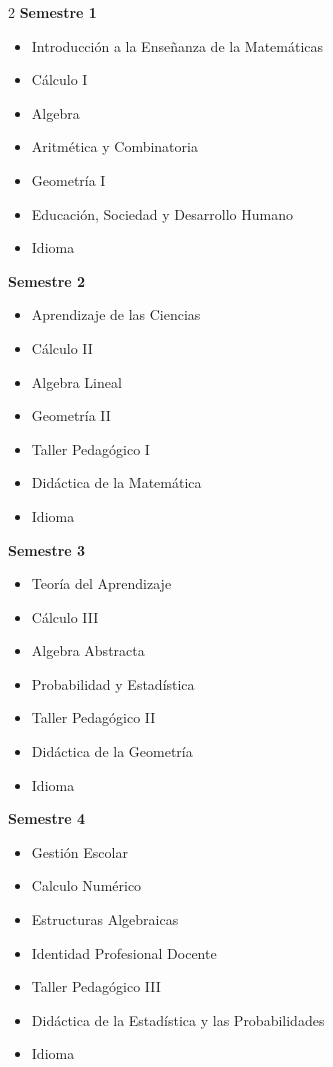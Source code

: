 \documentclass[12pt,a4paper]{article}
\begin{document}
	\begin{multicols}{2}
		\textbf{Semestre 1}
		\begin{itemize}
			\item Introducción a la Enseñanza de la Matemáticas
			\item Cálculo I
			\item Algebra
			\item Aritmética y Combinatoria
			\item Geometría I
			\item Educación, Sociedad y Desarrollo Humano
			\item Idioma
		\end{itemize}
		
		\textbf{Semestre 2}
		\begin{itemize}
			\item Aprendizaje de las Ciencias
			\item Cálculo II
			\item Algebra Lineal
			\item Geometría II
			\item Taller Pedagógico I
			\item Didáctica de la Matemática
			\item Idioma
		\end{itemize}
		
		\textbf{Semestre 3}
		\begin{itemize}
			\item Teoría del Aprendizaje
			\item Cálculo III
			\item Algebra Abstracta
			\item Probabilidad y Estadística
			\item Taller Pedagógico II
			\item Didáctica de la Geometría
			\item Idioma
		\end{itemize}
		
		\textbf{Semestre 4}
		\begin{itemize}
			\item Gestión Escolar
			\item Calculo Numérico
			\item Estructuras Algebraicas
			\item Identidad Profesional Docente
			\item Taller Pedagógico III
			\item Didáctica de la Estadística y las Probabilidades
			\item Idioma
		\end{itemize}
		

\end{multicols}
\end{document}

